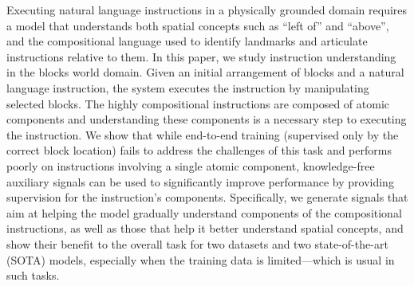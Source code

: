 Executing natural language instructions in a physically grounded domain requires a model that understands both spatial concepts such as ``left of'' and ``above'', and the compositional language used to identify landmarks and articulate instructions relative to them. In this paper, we study instruction understanding in the blocks world domain. Given an initial arrangement of blocks and a natural language instruction, the system executes the instruction by manipulating selected blocks. The highly compositional instructions are composed of atomic components and understanding these components is a necessary step to executing the instruction. We show that while end-to-end training (supervised only by the correct block location) fails to address the challenges of this task and performs poorly on instructions involving a single atomic component, knowledge-free auxiliary signals can be used to significantly improve performance by providing supervision for the instruction's components. Specifically, we generate signals that aim at helping the model gradually understand components of the compositional instructions, as well as those that help it better understand spatial concepts, and show their benefit to the overall task for two datasets and two state-of-the-art (SOTA) models, especially when the training data is limited---which is usual in such tasks.
